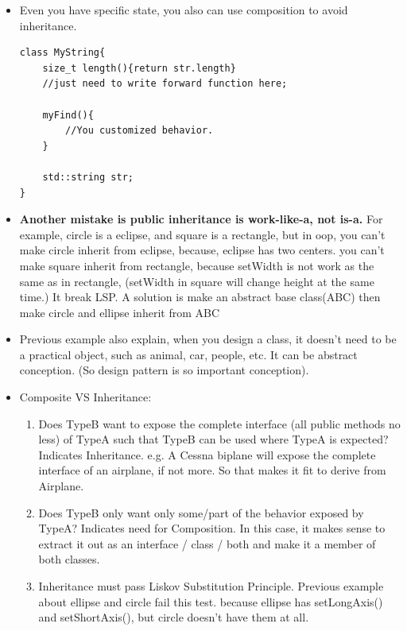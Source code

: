 \documentclass[a4paper,11pt,twoside]{book}
\begin{document}
\begin{itemize}
    \item Even you have specific state, you also can use composition to avoid inheritance.

\begin{lstlisting}[numbers=none]
class MyString{
	size_t length(){return str.length}
	//just need to write forward function here;
	
	myFind(){
		//You customized behavior.
	}
	
	std::string str;
}
\end{lstlisting}
	
	\item \textbf{Another mistake is public inheritance is work-like-a, not is-a.} For example, circle is a eclipse, and square is a rectangle, but in oop, you can't make circle inherit from eclipse, because, eclipse has two centers.  you can't make square inherit from rectangle, because setWidth is not work as the same as in rectangle, (setWidth in square will change height at the same time.) It break LSP.  A solution is make an abstract base class(ABC) then make circle and ellipse inherit from ABC
	
	\item Previous example also explain, when you design a class, it doesn't need to be a practical object, such as animal, car, people, etc.  It can be abstract conception.  (So design pattern is so important conception).
	
	\item Composite VS Inheritance:
	\begin{enumerate}
		\item Does TypeB want to expose the complete interface (all public methods no less) of TypeA such that TypeB can be used where TypeA is expected? Indicates Inheritance. e.g. A Cessna biplane will expose the complete interface of an airplane, if not more. So that makes it fit to derive from Airplane.
		
		\item Does TypeB only want only some/part of the behavior exposed by TypeA? Indicates need for Composition. In this case, it makes sense to extract it out as an interface / class / both and make it a member of both classes.
		
		\item Inheritance must pass Liskov Substitution Principle. Previous example about ellipse and circle fail this test. because ellipse has setLongAxis() and setShortAxis(), but circle doesn't have them at all.
	\end{enumerate}


\end{itemize}
\end{document}

